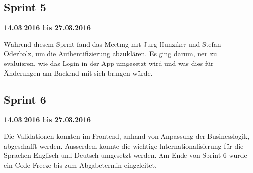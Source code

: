 \subsection{Sprint 5}
\textbf{14.03.2016 bis 27.03.2016}

Während diesem Sprint fand das Meeting mit Jürg Hunziker und Stefan Oderbolz, um die Authentifizierung abzuklären. 
Es ging darum, neu zu evaluieren, wie das Login in der App umgesetzt wird und was dies für Änderungen am Backend mit sich bringen würde. 

\subsection{Sprint 6}
\textbf{14.03.2016 bis 27.03.2016}

Die Validationen konnten im Frontend, anhand von Anpassung der Businesslogik, abgeschafft werden.
Ausserdem konnte die wichtige Internationalisierung für die Sprachen Englisch und Deutsch umgesetzt werden. 
Am Ende von Sprint 6 wurde ein Code Freeze bis zum Abgabetermin eingeleitet.
